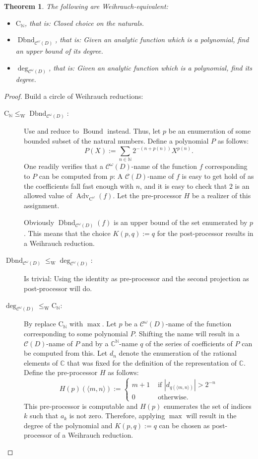 \documentclass{eptcs-modified}
\newtheorem{theorem}{Theorem}
\newcommand{\leqW}{\leq_{\textrm{W}}}
\newcommand{\CCN}{\mathrm{C}_{\NN}}
\newcommand{\C}{\textrm{C}}
\newcommand{\NN}{\mathbb{N}}
\newcommand{\CC}{\mathbb{C}}
\newcommand{\abs}[1]{\left|#1\right|}
\newcommand{\analytic}{\mathcal C^\omega(D)}
\newcommand{\cont}{\mathcal C(D)}
\newcommand{\Advc}{\operatorname{Adv}_{\C^\omega}}
\newcommand{\Bound}{\operatorname{Bound}}
\newcommand{\dbnd}{\operatorname{Dbnd}}
\begin{document}
			\begin{theorem}\label{resu:polynomials as analytic functions}
				The following are Weihrauch-equivalent:
				\begin{itemize}
					\item $\CCN$, that is: Closed choice on the naturals.
					\item $\dbnd_{\analytic}$, that is: Given an analytic function which is a polynomial, find an upper bound of its degree.
					\item $\deg_{\analytic}$, that is: Given an analytic function which is a polynomial, find its degree.
				\end{itemize}
			\end{theorem}
			\begin{proof}
				Build a circle of Weihrauch reductions:
				\begin{description}
					\item[$\CCN\leqW\dbnd_{\analytic}$:] Use  and reduce to $\Bound$ instead.
					Thus, let $p$ be an enumeration of some bounded subset of the natural numbers.
					Define a polynomial $P$ as follows:
					\[ P(X) := \sum_{n\in\NN} 2^{-(n + p(n))} X^{p(n)}. \]
					One readily verifies that a $\analytic$-name of the function $f$ corresponding to $P$ can be computed from $p$: A $\cont$-name of $f$ is easy to get hold of as the coefficients fall fast enough with $n$, and it is easy to check that $2$ is an allowed value of $\Advc(f)$.
					Let the pre-processor $H$ be a realizer of this assignment.

					Obviously $\dbnd_{\analytic}(f)$ is an upper bound of the set enumerated by $p$.
					This means that the choice $K(p,q):=q$ for the post-processor results in a Weihrauch reduction.
					\item[$\dbnd_{\analytic}\leqW\deg_{\analytic}$:]
					Is trivial: Using the identity as pre-processor and the second projection as post-processor will do.
					\item[$\deg_{\analytic}\leqW\CCN$:]
					By  replace $\CCN$ with $\max$.
					Let $p$ be a $\analytic$-name of the function corresponding to some polynomial $P$.
					Shifting the name will result in a $\cont$-name of $P$ and by  a $\CC^\NN$-name $q$ of the series of coefficients of $P$ can be computed from this.
					Let $d_n$ denote the enumeration of the rational elements of $\CC$ that was fixed for the definition of the representation of $\CC$.
					Define the pre-processor $H$ as follows:
					\[ H(p)(\langle m,n\rangle) := \begin{cases} m+1 &\text{ if }\abs{d_{q(\langle m,n\rangle)}} > 2^{-n} \\ 0 & \text{ otherwise}.\end{cases} \]
					This pre-processor is computable and $H(p)$ enumerates the set of indices $k$ such that $a_k$ is not zero.
					Therefore, applying $\max$ will result in the degree of the polynomial and $K(p,q):=q$ can be chosen as post-processor of a Weihrauch reduction.
				\end{description}
			\end{proof}
\end{document}
